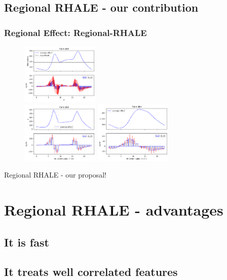 \documentclass{beamer}
\begin{document}
\subsection{Regional RHALE - our contribution}
\begin{frame}
  \frametitle{Regional Effect: Regional-RHALE}
  \begin{figure}[ht]
    \centering
    \includegraphics[width=0.33\textwidth]{./figures/bike_sharing_global_rhale_heterogeneity.png} \\
    \includegraphics[width=0.33\textwidth]{./figures/bike_sharing_regional_rhale_workingdays.png}
    \includegraphics[width=0.33\textwidth]{./figures/bike_sharing_regional_rhale_weekends.png}
  \end{figure}
  \noindent\makebox[\linewidth]{\rule{\paperwidth}{0.4pt}}
  Regional RHALE - our proposal!
\end{frame}

\section{Regional RHALE - advantages}

\subsection{It is fast}

\subsection{It treats well correlated features}
\end{document}
